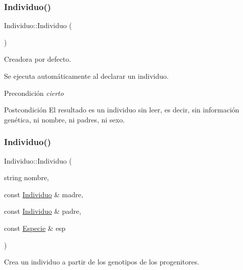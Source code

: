\subsubsection{\texorpdfstring{Individuo()}{Individuo()}\hspace{0.1cm}{\footnotesize\ttfamily [1/2]}}
{\footnotesize\ttfamily Individuo\+::\+Individuo (\begin{DoxyParamCaption}{ }\end{DoxyParamCaption})}



Creadora por defecto. 

Se ejecuta automáticamente al declarar un individuo. \begin{DoxyPrecond}{Precondición}
{\itshape cierto} 
\end{DoxyPrecond}
\begin{DoxyPostcond}{Postcondición}
El resultado es un individuo sin leer, es decir, sin información genética, ni nombre, ni padres, ni sexo. 
\end{DoxyPostcond}
\mbox{\label{class_individuo_aa4e303d7179a1ad0f0f2986d093d830a}} 
\subsubsection{\texorpdfstring{Individuo()}{Individuo()}\hspace{0.1cm}{\footnotesize\ttfamily [2/2]}}
{\footnotesize\ttfamily Individuo\+::\+Individuo (\begin{DoxyParamCaption}\item[{string}]{nombre,  }\item[{const \hyperlink{class_individuo}{Individuo} \&}]{madre,  }\item[{const \hyperlink{class_individuo}{Individuo} \&}]{padre,  }\item[{const \hyperlink{class_especie}{Especie} \&}]{esp }\end{DoxyParamCaption})}



Crea un individuo a partir de los genotipos de los progenitores. 

